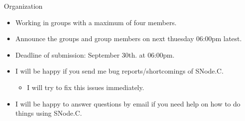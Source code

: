 ﻿\begin{frame}{Organization}
  \begin{itemize}
    \item Working in groups with a maximum of four members.
    \item Announce the groups and group members on next thuesday 06:00pm latest.
    \item Deadline of submission: September 30th. at 06:00pm.
    \item I will be happy if you send me bug reports/shortcomings of SNode.C.
    \begin{itemize}
      \item I will try to fix this issues immediately.
    \end{itemize}
    \item I will be happy to answer questions by email if you need help on how to do things using SNode.C.
  \end{itemize}
\end{frame}

